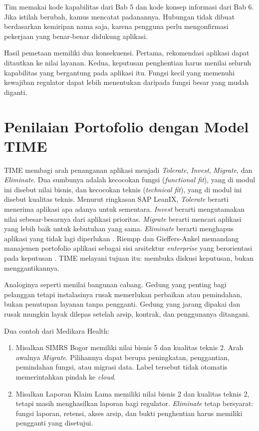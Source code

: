 Tim memakai kode kapabilitas dari Bab 5 dan kode konsep informasi dari Bab 6. Jika istilah berubah,
kamus mencatat padanannya. Hubungan tidak dibuat berdasarkan kemiripan nama saja, karena pengguna
perlu mengonfirmasi pekerjaan yang benar-benar didukung aplikasi.

Hasil pemetaan memiliki dua konsekuensi. Pertama, rekomendasi aplikasi dapat ditautkan ke nilai
layanan. Kedua, keputusan penghentian harus menilai seluruh kapabilitas yang bergantung pada aplikasi
itu. Fungsi kecil yang memenuhi kewajiban regulator dapat lebih menentukan daripada fungsi besar yang
mudah diganti.

\section{Penilaian Portofolio dengan Model TIME}

TIME membagi arah penanganan aplikasi menjadi \textit{Tolerate}, \textit{Invest}, \textit{Migrate},
dan \textit{Eliminate}. Dua sumbunya adalah kecocokan fungsi (\textit{functional fit}), yang di modul
ini disebut nilai bisnis, dan kecocokan teknis (\textit{technical fit}), yang di modul ini disebut
kualitas teknis. Menurut ringkasan SAP LeanIX, \textit{Tolerate} berarti menerima aplikasi apa adanya
untuk sementara. \textit{Invest} berarti mengutamakan nilai sebesar-besarnya dari aplikasi prioritas.
\textit{Migrate} berarti mencari aplikasi yang lebih baik untuk kebutuhan yang sama. \textit{Eliminate}
berarti menghapus aplikasi yang tidak lagi diperlukan \cite{c07-sheppard2023}. Riempp dan
Gieffers-Ankel memandang manajemen portofolio aplikasi sebagai sisi arsitektur \textit{enterprise}
yang berorientasi pada keputusan \cite{c07-riempp2007}. TIME melayani tujuan itu: membuka diskusi
keputusan, bukan menggantikannya.

Analoginya seperti menilai bangunan cabang. Gedung yang penting bagi pelanggan tetapi instalasinya
rusak memerlukan perbaikan atau pemindahan, bukan penutupan layanan tanpa pengganti. Gedung yang
jarang dipakai dan rusak mungkin layak dilepas setelah arsip, kontrak, dan penggunanya ditangani.

Dua contoh dari Medikara Health:

\begin{enumerate}
  \item Misalkan SIMRS Bogor memiliki nilai bisnis 5 dan kualitas teknis 2. Arah awalnya
        \textit{Migrate}. Pilihannya dapat berupa peningkatan, penggantian, pemindahan fungsi, atau
        migrasi data. Label tersebut tidak otomatis memerintahkan pindah ke \textit{cloud}.
  \item Misalkan Laporan Klaim Lama memiliki nilai bisnis 2 dan kualitas teknis 2, tetapi masih
        menghasilkan laporan bagi regulator. \textit{Eliminate} tetap bersyarat: fungsi laporan,
        retensi, akses arsip, dan bukti penghentian harus memiliki pengganti yang disetujui.
\end{enumerate}

